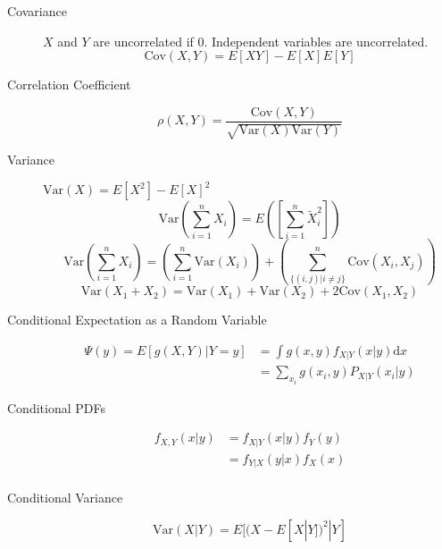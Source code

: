 \documentclass[8pt]{article}
\newcommand{\dd}[1]{\mathrm{d}{#1}}
\begin{document}

\begin{multicols}{2}
  \begin{description}
  \item[Covariance] $X$ and $Y$ are uncorrelated if 0. Independent
    variables are uncorrelated.
    $$\text{Cov}(X,Y)=E[XY]-E[X]E[Y]$$
  \item[Correlation Coefficient]
    $$\rho(X,Y)=\frac{\text{Cov}(X,Y)}{\sqrt{\text{Var}(X)\text{Var}(Y)}}$$
  \item[Variance] $\text{Var}(X) = E[X^2] - E[X]^2$
    $$\text{Var}\left(\sum_{i=1}^{n}X_i\right) =
    E\left(\left[\sum_{i=1}^{n}\tilde{X}_i^2\right]\right)$$
    $$\text{Var}\left(\sum_{i=1}^{n}X_i\right) =
    \left(\sum_{i=1}^{n}\text{Var}(X_i)\right) + \left(\sum_{\{(i,j) |
        i\not= j\}}^{n}\text{Cov}(X_i, X_j)\right)$$
    $$\text{Var}(X_1 + X_2) = \text{Var}(X_1) + \text{Var}(X_2) +
    2\text{Cov}(X_1,X_2)$$
  \item[Conditional Expectation as a Random Variable]
    \begin{equation*}
      \begin{aligned}
        \Psi(y) = E[g(X,Y)|Y=y] &= \int g(x,y) f_{X|Y}(x|y) \dd{x} \\
        &= \sum_{x_i} g(x_i,y) P_{X|Y}(x_i|y)
      \end{aligned}
    \end{equation*}
  \item[Conditional PDFs]
    \begin{equation*}
      \begin{aligned}
        f_{X,Y}(x|y) &= f_{X|Y}(x|y)f_Y(y) \\
        &= f_{Y|X}(y|x)f_X(x) \\
      \end{aligned}
    \end{equation*}
  \item[Conditional Variance]
    $$ \text{Var}(X|Y) = E[(X-E[X|Y])^2|Y] $$
  \end{description}
\end{multicols}
\end{document}

